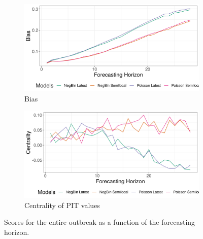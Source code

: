 \begin{figure}[H]
\begin{subfigure}{0.5\textwidth}
  \centering
  \includegraphics[width=\linewidth]{../output/Alimbongo_bias.png}  
  \caption{Bias}
  \label{fig:sub-third}
\end{subfigure}
\begin{subfigure}{0.5\textwidth}
  \centering
  \includegraphics[width=\linewidth]{../output/Alimbongo_centrality.png}  
  \caption{Centrality of PIT values}
  \label{fig:nat_scores_4}
\end{subfigure}
  \caption{Scores for the entire outbreak as a function of the forecasting horizon.}

  \label{fig:nat_scores}
\end{figure}
